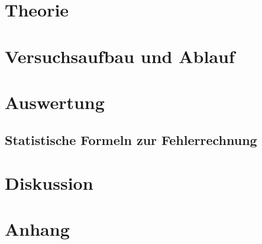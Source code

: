 \documentclass[a4,11pt]{article}
\newcommand{\V}{V402}
\begin{document}



\tableofcontents
\clearpage


\section{Theorie}

\clearpage


\section{Versuchsaufbau und Ablauf}

\clearpage


\section{Auswertung}
\subsection{Statistische Formeln zur Fehlerrechnung}
\label{sec:Fehlerrechnung}

%
\clearpage

\clearpage


\section{Diskussion}


\clearpage
\section{Anhang}
\listoftodos
\listoffigures
\listoftables
\nocite{\V}
\printbibliography[title = Literaturverzeichnis]
\end{document}
